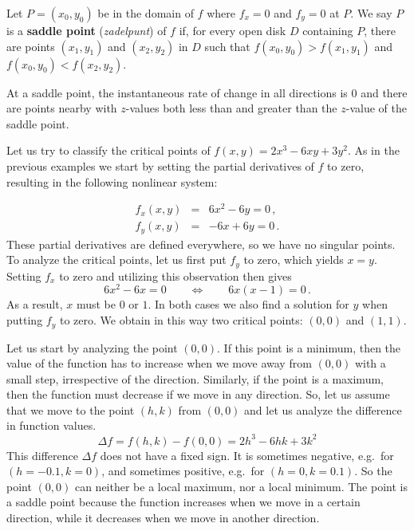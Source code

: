 \begin{definition}\label{def:saddle_point}
Let $P=(x_0,y_0)$ be in the domain of $f$ where $f_x=0$ and $f_y=0$ at $P$. We say $P$ is a \textbf{saddle point} (\textit{zadelpunt}) of $f$ if, for every open disk $D$ containing $P$, there are points $(x_1,y_1)$ and $(x_2,y_2)$ in $D$ such that $f(x_0,y_0)>f(x_1,y_1)$ and $f(x_0,y_0)<f(x_2,y_2)$.
\end{definition}

At a saddle point, the instantaneous rate of change in all directions is 0 and there are points nearby with $z$-values both less than and greater than the $z$-value of the saddle point.

\begin{example}
\label{FCP4}
Let us try to classify the critical points of $f(x,y) = 2 x^3 - 6 x y + 3 y^2$. As in the previous examples we start by setting the partial derivatives of $f$ to zero, resulting in the following nonlinear system: 

\begin{eqnarray*}
f_x(x,y) &=& 6 x^2 - 6 y = 0\,,\\ 
f_y(x,y) &=& -6 x + 6 y = 0\,.
\end{eqnarray*}
These partial derivatives are defined everywhere, so we have no singular points. To analyze the critical points, let us first put $f_y$ to zero, which yields $x=y$. Setting $f_x$ to zero and utilizing this observation then gives
$$6x^2 - 6x = 0 \qquad 
\Leftrightarrow \qquad 6x(x-1) = 0 \,. $$
As a result, $x$ must be $0$ or $1$. In both cases we also find a solution for $y$ when putting $f_y$ to zero. We obtain in this way two critical points: $(0,0)$ and $(1,1)$. 

Let us start by analyzing the point $(0,0)$. If this point is a minimum, then the value of the function has to increase when we move away from $(0,0)$ with a small step, irrespective of the direction. Similarly, if the point is a maximum, then the function must decrease if we move in any direction. So, let us assume that we move to the point $(h,k)$ from $(0,0)$ and let us analyze the difference in function values.     
$$
\Delta f = f(h,k) - f(0,0) =   2 h^3 - 6 hk + 3 k^2
$$
This difference $\Delta f$ does not have a fixed sign. It is sometimes negative, e.g.\ for $(h=-0.1,k=0)$, and sometimes positive, e.g.\ for $(h=0,k=0.1)$. So the point $(0,0)$ can neither be a local maximum, nor a local minimum. The point is a saddle point because the function increases when we move in a certain direction, while it decreases when we move in another direction. 


\end{example}
